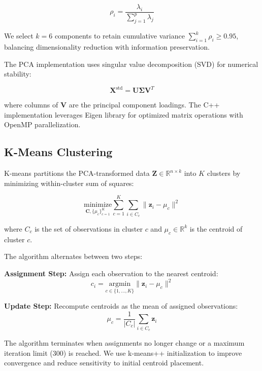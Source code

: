 \documentclass[11pt]{article}
\begin{document}
\begin{equation}
\rho_i = \frac{\lambda_i}{\sum_{j=1}^{p} \lambda_j}
\end{equation}

We select $k=6$ components to retain cumulative variance $\sum_{i=1}^{k} \rho_i \geq 0.95$, balancing dimensionality reduction with information preservation.

The PCA implementation uses singular value decomposition (SVD) for numerical stability:

\begin{equation}
\mathbf{X}^{\text{std}} = \mathbf{U} \mathbf{\Sigma} \mathbf{V}^T
\end{equation}

where columns of $\mathbf{V}$ are the principal component loadings. The C++ implementation leverages Eigen library for optimized matrix operations with OpenMP parallelization.

\subsection{K-Means Clustering}

K-means partitions the PCA-transformed data $\mathbf{Z} \in \mathbb{R}^{n \times k}$ into $K$ clusters by minimizing within-cluster sum of squares:

\begin{equation}
\underset{\mathbf{C}, \{\mu_c\}_{c=1}^{K}}{\text{minimize}} \sum_{c=1}^{K} \sum_{i \in C_c} \|\mathbf{z}_i - \mu_c\|^2
\end{equation}

where $C_c$ is the set of observations in cluster $c$ and $\mu_c \in \mathbb{R}^k$ is the centroid of cluster $c$.

The algorithm alternates between two steps:

\textbf{Assignment Step:} Assign each observation to the nearest centroid:
\begin{equation}
c_i = \underset{c \in \{1,\ldots,K\}}{\text{argmin}} \|\mathbf{z}_i - \mu_c\|^2
\end{equation}

\textbf{Update Step:} Recompute centroids as the mean of assigned observations:
\begin{equation}
\mu_c = \frac{1}{|C_c|} \sum_{i \in C_c} \mathbf{z}_i
\end{equation}

The algorithm terminates when assignments no longer change or a maximum iteration limit (300) is reached. We use k-means++ initialization \cite{arthur2007k} to improve convergence and reduce sensitivity to initial centroid placement.
\end{document}
